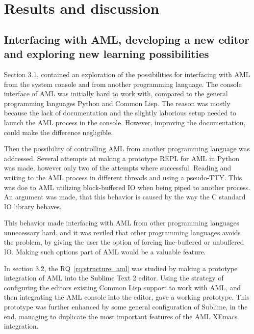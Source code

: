 
\section{Results and discussion} %
\label{sec:discussion}

\subsection{Interfacing with AML, developing a new editor and exploring new learning possibilities} %
\label{sub:interfacing_with_aml_developing_a_new_editor_and_exploring_new_learning_possibilities}
Section 3.1, contained an exploration of the possibilities for interfacing with AML from the system console and from another programming language. The console interface of AML was initially hard to work with, compared to the general programming languages Python and Common Lisp. The reason was mostly because the lack of documentation and the slightly laborious setup needed to launch the AML process in the console. However, improving the documentation, could make the difference negligible.

Then the possibility of controlling AML from another programming language was addressed. Several attempts at making a prototype REPL for AML in Python was made, however only two of the attempts where successful. Reading and writing to the AML process in different threads and using a pseudo-TTY. This was doe to AML utilizing block-buffered IO when being piped to another process. An argument was made, that this behavior is caused by the way the C standard IO library behaves.

This behavior made interfacing with AML from other programming languages unnecessary hard, and it was reviled that other programming languages avoids the problem, by giving the user the option of forcing line-buffered or unbuffered IO. Making such options part of AML would be a valuable feature.

In section 3.2, the RQ~\ref{rq:structure_aml} was studied by making a prototype integration of AML into the Sublime Text 2 editor. Using the strategy of configuring the editors existing Common Lisp support to work with AML, and then integrating the AML console into the editor, gave a working prototype. This prototype was further enhanced by some general configuration of Sublime, in the end, managing to duplicate the most important features of the AML XEmacs integration.

